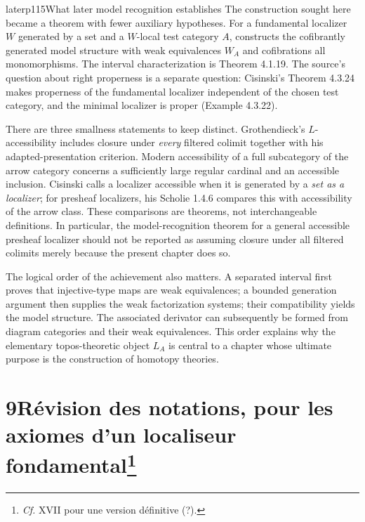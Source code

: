 \begin{dcomment}{later}{p115}{What later model recognition establishes}
The construction sought here became a theorem with fewer auxiliary hypotheses. For a fundamental localizer $W$ generated by a set and a $W$-local test category $A$, \citet[Corollary 4.2.18]{Cisinski2006} constructs the cofibrantly generated model structure with weak equivalences $W_A$ and cofibrations all monomorphisms. The interval characterization is Theorem 4.1.19. The source's question about right properness is a separate question: Cisinski's Theorem 4.3.24 makes properness of the fundamental localizer independent of the chosen test category, and the minimal localizer is proper (Example 4.3.22).

There are three smallness statements to keep distinct. Grothendieck's $L$-accessibility includes closure under \emph{every} filtered colimit together with his adapted-presentation criterion. Modern accessibility of a full subcategory of the arrow category concerns a sufficiently large regular cardinal and an accessible inclusion. Cisinski calls a localizer accessible when it is generated by a \emph{set as a localizer}; for presheaf localizers, his Scholie 1.4.6 compares this with accessibility of the arrow class. These comparisons are theorems, not interchangeable definitions. In particular, the model-recognition theorem for a general accessible presheaf localizer should not be reported as assuming closure under all filtered colimits merely because the present chapter does so.

The logical order of the achievement also matters. A separated interval first proves that injective-type maps are weak equivalences; a bounded generation argument then supplies the weak factorization systems; their compatibility yields the model structure. The associated derivator can subsequently be formed from diagram categories and their weak equivalences. This order explains why the elementary topos-theoretic object $L_A$ is central to a chapter whose ultimate purpose is the construction of homotopy theories.
\end{dcomment}


\section*{9\quad Révision des notations, pour les axiomes d'un localiseur fondamental\footnote[43]{\textit{Cf.} XVII pour une version définitive (?).}}

